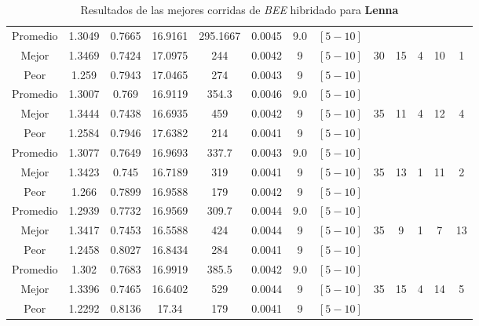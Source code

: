 \begin{table}[h!]
\begin{center}
\begin{tabular}{|c|c|c|c|c|c|c|c|c|c|c|c|c|}
        \hline
        \hline
            Promedio  & 1.3049 & 0.7665 & 16.9161 & 295.1667 & 0.0045 & 9.0 & $[5-10]$ &  &  &  &  & \\
            \cline{1-8}
            Mejor & 1.3469 & 0.7424  & 17.0975 & 244 & 0.0042 & 9 & $[5-10]$ & 30 & 15 & 4 & 10 & 1\\
            \cline{1-8}
            Peor & 1.259 & 0.7943  & 17.0465 & 274 & 0.0043 & 9 & $[5-10]$ &  &  &  &  & \\
        \hline
        \hline
            Promedio  & 1.3007 & 0.769 & 16.9119 & 354.3 & 0.0046 & 9.0 & $[5-10]$ &  &  &  &  & \\
            \cline{1-8}
            Mejor & 1.3444 & 0.7438  & 16.6935 & 459 & 0.0042 & 9 & $[5-10]$ & 35 & 11 & 4 & 12 & 4\\
            \cline{1-8}
            Peor & 1.2584 & 0.7946  & 17.6382 & 214 & 0.0041 & 9 & $[5-10]$ &  &  &  &  & \\
        \hline
        \hline
            Promedio  & 1.3077 & 0.7649 & 16.9693 & 337.7 & 0.0043 & 9.0 & $[5-10]$ &  &  &  &  & \\
            \cline{1-8}
            Mejor & 1.3423 & 0.745  & 16.7189 & 319 & 0.0041 & 9 & $[5-10]$ & 35 & 13 & 1 & 11 & 2\\
            \cline{1-8}
            Peor & 1.266 & 0.7899  & 16.9588 & 179 & 0.0042 & 9 & $[5-10]$ &  &  &  &  & \\
        \hline
        \hline
            Promedio  & 1.2939 & 0.7732 & 16.9569 & 309.7 & 0.0044 & 9.0 & $[5-10]$ &  &  &  &  & \\
            \cline{1-8}
            Mejor & 1.3417 & 0.7453  & 16.5588 & 424 & 0.0044 & 9 & $[5-10]$ & 35 & 9 & 1 & 7 & 13\\
            \cline{1-8}
            Peor & 1.2458 & 0.8027  & 16.8434 & 284 & 0.0041 & 9 & $[5-10]$ &  &  &  &  & \\
        \hline
        \hline
            Promedio  & 1.302 & 0.7683 & 16.9919 & 385.5 & 0.0042 & 9.0 & $[5-10]$ &  &  &  &  & \\
            \cline{1-8}
            Mejor & 1.3396 & 0.7465  & 16.6402 & 529 & 0.0044 & 9 & $[5-10]$ & 35 & 15 & 4 & 14 & 5\\
            \cline{1-8}
            Peor & 1.2292 & 0.8136  & 17.34 & 179 & 0.0041 & 9 & $[5-10]$ &  &  &  &  & \\
        \hline
        \end{tabular}
        \caption{Resultados de las mejores corridas de \emph{BEE} hibridado para {\bf Lenna}}
        \label{tb:tablebeehibimg}
    \end{center}
\end{table}


